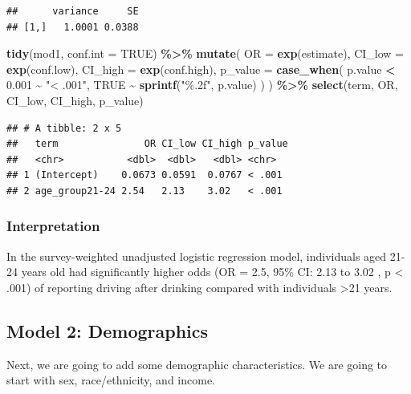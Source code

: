 \documentclass[
]{article}
\newenvironment{Shaded}{\begin{snugshade}}{\end{snugshade}}
\newcommand{\AttributeTok}[1]{\textcolor[rgb]{0.13,0.29,0.53}{#1}}
\newcommand{\ConstantTok}[1]{\textcolor[rgb]{0.56,0.35,0.01}{#1}}
\newcommand{\FloatTok}[1]{\textcolor[rgb]{0.00,0.00,0.81}{#1}}
\newcommand{\FunctionTok}[1]{\textcolor[rgb]{0.13,0.29,0.53}{\textbf{#1}}}
\newcommand{\NormalTok}[1]{#1}
\newcommand{\SpecialCharTok}[1]{\textcolor[rgb]{0.81,0.36,0.00}{\textbf{#1}}}
\newcommand{\StringTok}[1]{\textcolor[rgb]{0.31,0.60,0.02}{#1}}
\begin{document}
\begin{verbatim}
##      variance     SE
## [1,]   1.0001 0.0388
\end{verbatim}

\begin{Shaded}
\begin{Highlighting}[]
\FunctionTok{tidy}\NormalTok{(mod1, }\AttributeTok{conf.int =} \ConstantTok{TRUE}\NormalTok{) }\SpecialCharTok{\%\textgreater{}\%}
 \FunctionTok{mutate}\NormalTok{(}
    \AttributeTok{OR =} \FunctionTok{exp}\NormalTok{(estimate),}
    \AttributeTok{CI\_low =} \FunctionTok{exp}\NormalTok{(conf.low),}
    \AttributeTok{CI\_high =} \FunctionTok{exp}\NormalTok{(conf.high),}
     \AttributeTok{p\_value =} \FunctionTok{case\_when}\NormalTok{(}
\NormalTok{      p.value }\SpecialCharTok{\textless{}} \FloatTok{0.001} \SpecialCharTok{\textasciitilde{}} \StringTok{"\textless{} .001"}\NormalTok{,}
      \ConstantTok{TRUE} \SpecialCharTok{\textasciitilde{}} \FunctionTok{sprintf}\NormalTok{(}\StringTok{"\%.2f"}\NormalTok{, p.value)}
\NormalTok{    )}
\NormalTok{  ) }\SpecialCharTok{\%\textgreater{}\%}
  \FunctionTok{select}\NormalTok{(term, OR, CI\_low, CI\_high, p\_value)}
\end{Highlighting}
\end{Shaded}

\begin{verbatim}
## # A tibble: 2 x 5
##   term               OR CI_low CI_high p_value
##   <chr>           <dbl>  <dbl>   <dbl> <chr>  
## 1 (Intercept)    0.0673 0.0591  0.0767 < .001 
## 2 age_group21-24 2.54   2.13    3.02   < .001
\end{verbatim}

\subsubsection{Interpretation}\label{interpretation}

In the survey-weighted unadjusted logistic regression model, individuals
aged 21-24 years old had significantly higher odds (OR = 2.5, 95\% CI:
2.13 to 3.02 , p \textless{} .001) of reporting driving after drinking
compared with individuals \textgreater21 years.

\subsection{Model 2: Demographics}\label{model-2-demographics}

Next, we are going to add some demographic characteristics. We are going
to start with sex, race/ethnicity, and income.
\end{document}
